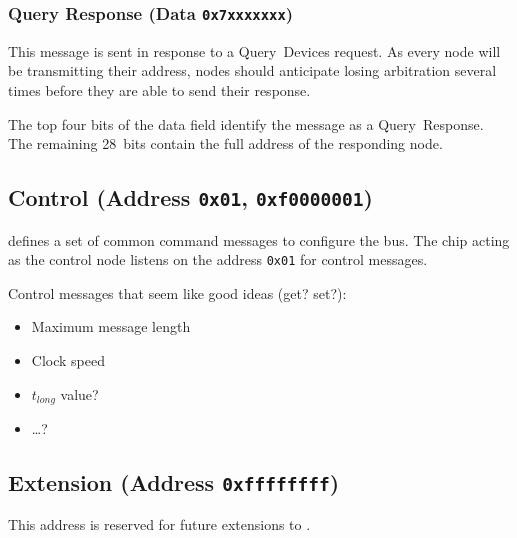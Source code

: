 \subsubsection{Query Response (Data \texttt{0x7xxxxxxx})}
This message is sent in response to a Query~Devices request. As every node
will be transmitting their address, nodes should anticipate losing arbitration
several times before they are able to send their response.

The top four bits of the data field identify the message as a Query~Response.
The remaining 28~bits contain the full address of the responding node.

\subsection{Control (Address \texttt{0x01}, \texttt{0xf0000001})}
\bus defines a set of common command messages to configure the bus. The chip
acting as the control node listens on the address {\tt 0x01} for \bus control
messages.

Control messages that seem like good ideas (get? set?):
\begin{itemize}
  \item Maximum message length
  \item Clock speed
  \item $t_{long}$ value?
  \item \ldots?
\end{itemize}

\subsection{Extension (Address \texttt{0xffffffff})}
This address is reserved for future extensions to \bus.

